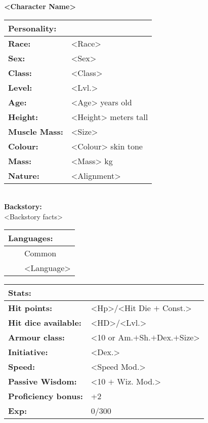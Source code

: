 \documentclass[11pt]{article}
\newcommand{\tabitem}{~~\llap{--}~~}
\begin{document}
	\begin{center}
\Huge \textbf{<Character Name>}
	\end{center}
	\begin{multicols}{2}
\noindent \begin{tabularx}{\linewidth}{@{}l l}
\Large \textbf{Personality:} 	& 						\\
\hline
\textbf{Race:} 					& <Race>	 			\\
\textbf{Sex:} 					& <Sex> 				\\
\textbf{Class:}					& <Class>				\\
\textbf{Level:} 				& <Lvl.>				\\
\textbf{Age:} 					& <Age> years old		\\
\textbf{Height:} 				& <Height> meters tall 	\\
\textbf{Muscle Mass:} 			& <Size> 				\\
\textbf{Colour:} 				& <Colour> skin tone 	\\
\textbf{Mass:} 					& <Mass> kg		 		\\
\textbf{Nature:} 				& <Alignment>
		\end{tabularx} \\
\textbf{Backstory:} \\
<Backstory facts>

\noindent \begin{tabularx}{\linewidth}{@{}l}
{\Large \textbf{Languages:}} \\
\hline
\tabitem Common \\
\tabitem <Language>
		\end{tabularx}

\vspace{4mm}

\noindent \begin{tabularx}{\linewidth}{@{}l l}
\Large \textbf{Stats:}		 	& 									\\
\hline
\textbf{Hit points:} 			& <Hp>/<Hit Die $+$ Const.> 			\\
\textbf{Hit dice available:}	& <HD>/<Lvl.>						\\
\textbf{Armour class:} 			& <10 or Am.$+$Sh.$+$Dex.$+$Size> 	\\
\textbf{Initiative:} 			& <Dex.>							\\
\textbf{Speed:} 				& <Speed Mod.>	 						\\
\textbf{Passive Wisdom:} 		& <10 $+$ Wiz. Mod.>	 					\\
\textbf{Proficiency bonus:}		& +2								\\
\textbf{Exp:} 					& 0/300
		\end{tabularx}


\end{multicols}
\end{document}
